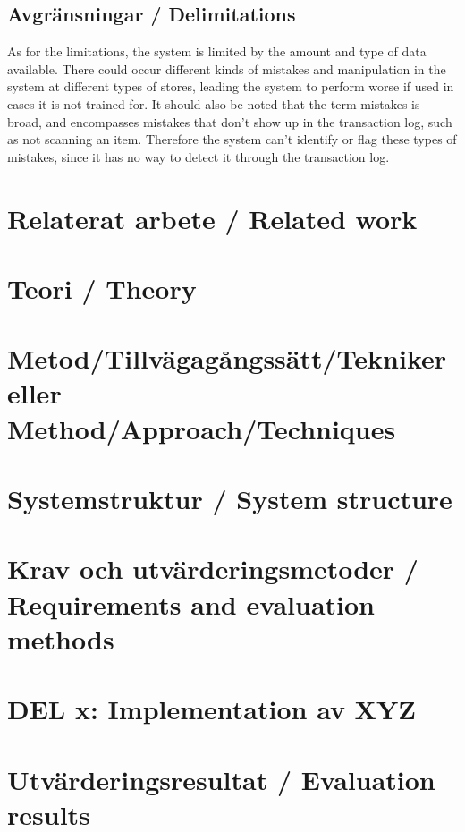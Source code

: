 \documentclass[a4paper,12pt]{article}
\begin{document}
\subsection{Avgränsningar / Delimitations}
As for the limitations, the system is limited by the amount and type of data available. There could occur different kinds of mistakes and manipulation in the system at different types of stores, leading the system to perform worse if used in cases it is not trained for. It should also be noted that the term mistakes is broad, and encompasses mistakes that don't show up in the transaction log, such as not scanning an item. Therefore the system can't identify or flag these types of mistakes, since it has no way to detect it through the transaction log.

\section{Relaterat arbete / Related work}

\section{Teori / Theory}
\label{sec:teori}

\section{Metod/Tillvägagångssätt/Tekniker eller Method/Approach/Techniques}
\label{sec:metod}

\section{Systemstruktur / System structure}
\label{sec:systemstruktur}

\section{Krav och utvärderingsmetoder / Requirements and evaluation methods}
\label{sec:krav}

\section{DEL x: Implementation av XYZ}
\label{sec:del-x}

\section{Utvärderingsresultat / Evaluation results}
\end{document}
